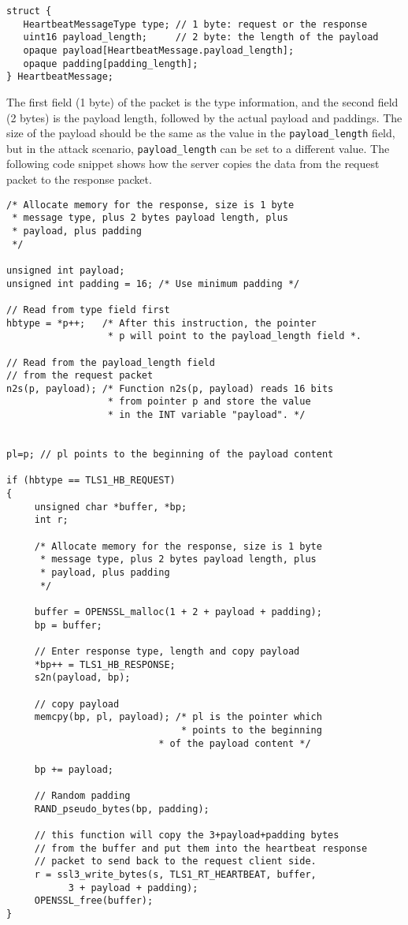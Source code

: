 \begin{lstlisting}
struct {
   HeartbeatMessageType type; // 1 byte: request or the response
   uint16 payload_length;     // 2 byte: the length of the payload
   opaque payload[HeartbeatMessage.payload_length]; 
   opaque padding[padding_length]; 
} HeartbeatMessage;
\end{lstlisting}


The first field (1 byte) of the packet is the type information, 
and the second field (2 bytes) is the payload length, followed by the 
actual payload and paddings. The size of the payload should be the same as
the value in the \texttt{payload\_length} field, but in the attack
scenario, \texttt{payload\_length} can be set to a different value. The
following code snippet shows how the server 
copies the data from the request packet to the response packet. 



\begin{lstlisting}[caption={Process the Heartbeat request packet and generate the response packet}, 
      label=heartbleed:source]
/* Allocate memory for the response, size is 1 byte
 * message type, plus 2 bytes payload length, plus
 * payload, plus padding
 */

unsigned int payload;
unsigned int padding = 16; /* Use minimum padding */

// Read from type field first  
hbtype = *p++;   /* After this instruction, the pointer
                  * p will point to the payload_length field *.

// Read from the payload_length field 
// from the request packet 
n2s(p, payload); /* Function n2s(p, payload) reads 16 bits
                  * from pointer p and store the value 
                  * in the INT variable "payload". */
			  
			  
pl=p; // pl points to the beginning of the payload content
			  
if (hbtype == TLS1_HB_REQUEST)
{
     unsigned char *buffer, *bp;
     int r;

     /* Allocate memory for the response, size is 1 byte
      * message type, plus 2 bytes payload length, plus
      * payload, plus padding
      */

     buffer = OPENSSL_malloc(1 + 2 + payload + padding);
     bp = buffer;

     // Enter response type, length and copy payload 
     *bp++ = TLS1_HB_RESPONSE;
     s2n(payload, bp);
        
     // copy payload 
     memcpy(bp, pl, payload); /* pl is the pointer which 
                               * points to the beginning 
	                       * of the payload content */

     bp += payload;
			    
     // Random padding
     RAND_pseudo_bytes(bp, padding);			    

     // this function will copy the 3+payload+padding bytes
     // from the buffer and put them into the heartbeat response 
     // packet to send back to the request client side.
     r = ssl3_write_bytes(s, TLS1_RT_HEARTBEAT, buffer,
           3 + payload + padding); 
     OPENSSL_free(buffer);	   
}
\end{lstlisting}


